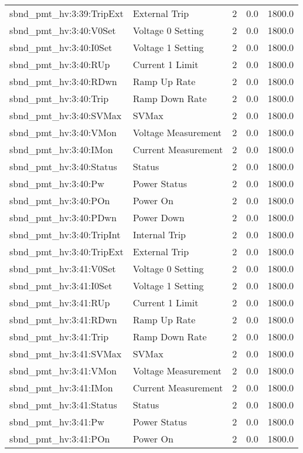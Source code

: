 \begin{center}
\begin{longtable}{l | l l l l }
sbnd\_pmt\_hv:3:39:TripExt & External Trip & 2 & 0.0 & 1800.0\\ 
sbnd\_pmt\_hv:3:40:V0Set & Voltage 0 Setting & 2 & 0.0 & 1800.0\\ 
sbnd\_pmt\_hv:3:40:I0Set & Voltage 1 Setting & 2 & 0.0 & 1800.0\\ 
sbnd\_pmt\_hv:3:40:RUp & Current 1 Limit & 2 & 0.0 & 1800.0\\ 
sbnd\_pmt\_hv:3:40:RDwn & Ramp Up Rate & 2 & 0.0 & 1800.0\\ 
sbnd\_pmt\_hv:3:40:Trip & Ramp Down Rate & 2 & 0.0 & 1800.0\\ 
sbnd\_pmt\_hv:3:40:SVMax & SVMax & 2 & 0.0 & 1800.0\\ 
sbnd\_pmt\_hv:3:40:VMon & Voltage Measurement & 2 & 0.0 & 1800.0\\ 
sbnd\_pmt\_hv:3:40:IMon & Current Measurement & 2 & 0.0 & 1800.0\\ 
sbnd\_pmt\_hv:3:40:Status & Status & 2 & 0.0 & 1800.0\\ 
sbnd\_pmt\_hv:3:40:Pw & Power Status & 2 & 0.0 & 1800.0\\ 
sbnd\_pmt\_hv:3:40:POn & Power On & 2 & 0.0 & 1800.0\\ 
sbnd\_pmt\_hv:3:40:PDwn & Power Down & 2 & 0.0 & 1800.0\\ 
sbnd\_pmt\_hv:3:40:TripInt & Internal Trip & 2 & 0.0 & 1800.0\\ 
sbnd\_pmt\_hv:3:40:TripExt & External Trip & 2 & 0.0 & 1800.0\\ 
sbnd\_pmt\_hv:3:41:V0Set & Voltage 0 Setting & 2 & 0.0 & 1800.0\\ 
sbnd\_pmt\_hv:3:41:I0Set & Voltage 1 Setting & 2 & 0.0 & 1800.0\\ 
sbnd\_pmt\_hv:3:41:RUp & Current 1 Limit & 2 & 0.0 & 1800.0\\ 
sbnd\_pmt\_hv:3:41:RDwn & Ramp Up Rate & 2 & 0.0 & 1800.0\\ 
sbnd\_pmt\_hv:3:41:Trip & Ramp Down Rate & 2 & 0.0 & 1800.0\\ 
sbnd\_pmt\_hv:3:41:SVMax & SVMax & 2 & 0.0 & 1800.0\\ 
sbnd\_pmt\_hv:3:41:VMon & Voltage Measurement & 2 & 0.0 & 1800.0\\ 
sbnd\_pmt\_hv:3:41:IMon & Current Measurement & 2 & 0.0 & 1800.0\\ 
sbnd\_pmt\_hv:3:41:Status & Status & 2 & 0.0 & 1800.0\\ 
sbnd\_pmt\_hv:3:41:Pw & Power Status & 2 & 0.0 & 1800.0\\ 
sbnd\_pmt\_hv:3:41:POn & Power On & 2 & 0.0 & 1800.0\\ 

\end{longtable}
\end{center}
